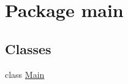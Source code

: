 \hypertarget{namespacemain}{}\section{Package main}
\label{namespacemain}
\subsection*{Classes}
\begin{DoxyCompactItemize}
\item 
class \mbox{\hyperlink{classmain_1_1_main}{Main}}
\end{DoxyCompactItemize}

